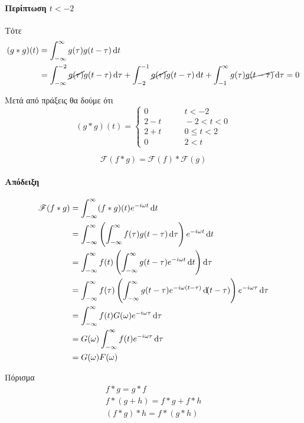 \documentclass[11pt,a4paper,titlepage,final]{article}
\begin{document}
\paragraph{Περίπτωση \(t<-2\)} Τότε \begin{align*}
(g*g)(t) &= \int_{-\infty}^\infty g(\tau)g(t-\tau)\dif t
\\ &= \int_{-\infty}^{-2} \cancel{g(\tau)}g(t-\tau)\dif\tau
+ \int_{-2}^{-1} \cancel{g(\tau)}g(t-\tau)\dif t
+ \int_{-1}^\infty g(\tau)\cancel{g(t-\tau)}\dif\tau=0
\end{align*}

Μετά από πράξεις θα δούμε ότι
\[
(g*g)(t)=\begin{cases}
0 &\qquad t<-2\\
2-t &\qquad -2<t<0\\
2+t &\qquad 0\leq t < 2\\
0 &\qquad 2<t
\end{cases}
\]

\begin{theorem*}{}
\[
\mathscr{F}(f*g)=
\mathscr{F}(f)
*
\mathscr{F}(g)
\]
\end{theorem*}
\paragraph{Απόδειξη}
\begin{align*}
\mathscr{F}(f*g) &= \int_{-\infty}^\infty (f*g)(t)e^{-i\omega t}\dif t
\\ 
&=
\int_{-\infty}^\infty
\left(
\int_{-\infty}^\infty f(\tau)g(t-\tau)\dif \tau\right)e^{-i\omega t}\dif t
\\ &=
\int_{-\infty}^\infty f(t) \left( \int_{-\infty}^\infty
g(t-\tau)e^{-i\omega t}
\dif t \right)
\dif\tau
\\ &=
\int_{-\infty}^\infty f(\tau)
\left(
\int_{-\infty}^\infty g(t-\tau)e^{-i\omega(t-\tau)}\dif(t-\tau)
\right)
e^{-i\omega\tau}\dif\tau
\\ &=
\int_{-\infty}^\infty f(t) G(\omega) e^{-i\omega\tau}\dif\tau
\\ &=
G(\omega) \int_{-\infty}^\infty f(t) e^{-i\omega\tau}\dif \tau
\\ &= G(\omega)F(\omega)
\end{align*}

\begin{theorem*}{Πόρισμα}
\begin{gather*}
f*g=g*f\\
f*(g+h)=f*g+f*h\\
(f*g)*h=f*(g*h)
\end{gather*}
\end{theorem*}
\end{document}

